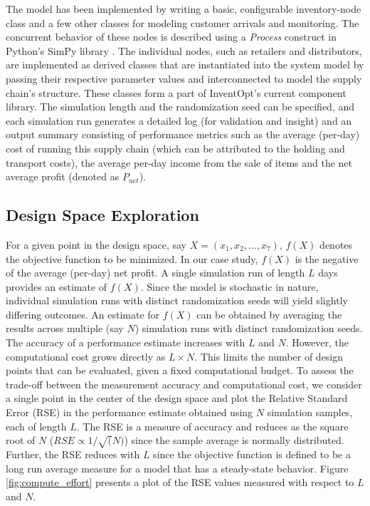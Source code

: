 %
The model has been implemented by writing a basic, configurable inventory-node class and a few other classes for modeling customer arrivals and monitoring.  The concurrent behavior of these nodes is described using a \textit{Process} construct in Python's SimPy library \cite{SimPy}.  The individual nodes, such as retailers and distributors, are implemented as derived classes that are instantiated into the system model by passing their respective parameter values and interconnected to model the supply chain's structure.  These classes form a part of InventOpt's current component library. The simulation length and the randomization seed can be specified, and each simulation run generates a detailed log (for validation and insight) and an output summary consisting of performance metrics such as the average (per-day) cost of running this supply chain (which can be attributed to the holding and transport costs), the average per-day income from the sale of items and the net average profit (denoted as $P_{net}$). 

\subsection{Design Space Exploration}

For a given point in the design space, say $X=(x_1,x_2,\dots,x_7)$, $f(X)$ denotes the objective function to be minimized. In our case study, $f(X)$ is the negative of the average (per-day) net profit. A single simulation run of length $L$ days provides an estimate of $f(X)$. Since the model is stochastic in nature, individual simulation runs with distinct randomization seeds will yield slightly differing outcomes. An estimate for $f(X)$ can be obtained by averaging the results across multiple (say $N$) simulation runs with distinct randomization seeds. The accuracy of a performance estimate increases with $L$ and $N$. However, the computational cost grows directly as $L\times N$. This limits the number of design points that can be evaluated, given a fixed computational budget. To assess the trade-off between the measurement accuracy and computational cost, we consider a single point in the center of the design space and plot the Relative Standard Error (RSE) in the performance estimate obtained using $N$ simulation samples, each of length $L$.  The RSE is a measure of accuracy and reduces as the square root of $N$ (${RSE}\propto {1}/{\sqrt(N)}$) since the sample average is normally distributed. Further, the RSE reduces with $L$ since the objective function is defined to be a long run average measure for a model that has a steady-state behavior. Figure \ref{fig:compute_effort} presents a plot of the RSE values measured with respect to $L$ and $N$.  

